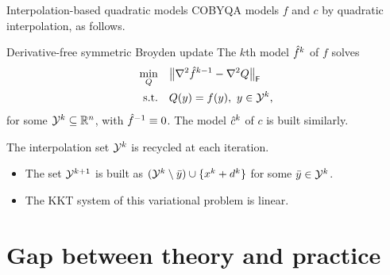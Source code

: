 \documentclass[
]{presentation}
\newcommand{\obj}{f}
\newcommand{\objm}[1][]{\hat{f}\ifblank{#1}{}{^{#1}}}
\newcommand{\con}{c}
\newcommand{\conm}[1][]{\hat{c}\ifblank{#1}{}{^{#1}}}
\newcommand{\iter}[1][]{x\ifblank{#1}{}{^{#1}}}
\newcommand{\step}[1][]{d\ifblank{#1}{}{^{#1}}}
\newcommand{\xpt}[1][]{\mathcal{Y}\ifblank{#1}{}{^{#1}}}
\begin{document}
\begin{frame}{Interpolation-based quadratic models}
    COBYQA models $\obj$ and $\con$ by \alert{quadratic} interpolation, as follows.

    \medskip

    \begin{block}{Derivative-free symmetric Broyden update \parencite{Powell_2004b}}
        The $k$th model $\objm[k]$ of $\obj$ solves
        \begin{align*}
            \min_Q          & \quad \norm[\big]{\nabla^2 \objm[k - 1] - \nabla^2 Q}_{\mathsf{F}}\\
            \textrm{s.t.}   & \quad Q(y) = \obj(y), ~ y \in \xpt[k],
        \end{align*}
        for some $\xpt[k] \subseteq \R^n$, with $\objm[-1] \equiv 0$.
        The model $\conm[k]$ of $\con$ is built similarly.
    \end{block}

    \medskip

    The interpolation set $\xpt[k]$ is \alert{recycled} at each iteration.
    \begin{itemize}
        \item The set $\xpt[k + 1]$ is built as $(\xpt[k] \setminus {\bar{y}}) \cup \set{\iter[k] + \step[k]}$ for some $\bar{y} \in \xpt[k]$.
        \item The KKT system of this variational problem is \alert{linear}.
    \end{itemize}
\end{frame}

\section{Gap between theory and practice}
\end{document}
